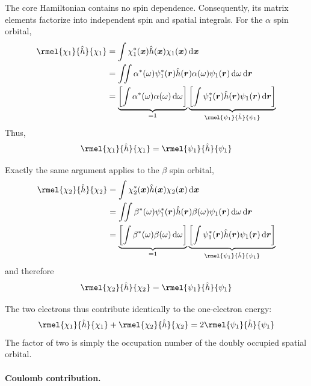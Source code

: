 \documentclass[11pt,a4paper,titlepage]{article}
\numberwithin{equation}{section}
\newcommand{\br}{\boldsymbol{r}}
\newcommand{\bx}{\boldsymbol{x}}
\newcommand{\hh}{\Hat{h}}
\begin{document}
The core Hamiltonian contains no spin dependence. Consequently, its matrix
elements factorize into independent spin and spatial integrals. For the
$\alpha$ spin orbital,
\begin{equation}
\begin{split}
  \rmel{\chi_1}{\hh}{\chi_1}
  &=
  \int
  \chi_1^*(\bx)
  \hh(\bx)
  \chi_1(\bx)
  \dd{\bx}
  \\
  &=
  \iint
  \alpha^*(\omega)
  \psi_1^*(\br)
  \hh(\br)
  \alpha(\omega)
  \psi_1(\br)
  \dd{\omega}\dd{\br}
  \\
  &=
  \underbrace{
  \qty[
    \int
    \alpha^*(\omega)\alpha(\omega)
    \dd{\omega}
  ]}_{=1}
  \underbrace{
  \qty[
    \int
    \psi_1^*(\br)
    \hh(\br)
    \psi_1(\br)
    \dd{\br}
  ]}_{\rmel{\psi_1}{\hh}{\psi_1}}
\end{split}
\end{equation}
Thus,
\begin{equation}
  \rmel{\chi_1}{\hh}{\chi_1}
  =
  \rmel{\psi_1}{\hh}{\psi_1}
\end{equation}

Exactly the same argument applies to the $\beta$ spin orbital,
\begin{equation}
\begin{split}
  \rmel{\chi_2}{\hh}{\chi_2}
  &=
  \int
  \chi_2^*(\bx)
  \hh(\bx)
  \chi_2(\bx)
  \dd{\bx}
  \\
  &=
  \iint
  \beta^*(\omega)
  \psi_1^*(\br)
  \hh(\br)
  \beta(\omega)
  \psi_1(\br)
  \dd{\omega}\dd{\br}
  \\
  &=
  \underbrace{
  \qty[
    \int
    \beta^*(\omega)\beta(\omega)
    \dd{\omega}
  ]}_{=1}
  \underbrace{
  \qty[
    \int
    \psi_1^*(\br)
    \hh(\br)
    \psi_1(\br)
    \dd{\br}
  ]}_{\rmel{\psi_1}{\hh}{\psi_1}}
\end{split}
\end{equation}
and therefore
\begin{equation}
  \rmel{\chi_2}{\hh}{\chi_2}
  =
  \rmel{\psi_1}{\hh}{\psi_1}
\end{equation}

The two electrons thus contribute identically to the one-electron energy:
\begin{equation}
  \rmel{\chi_1}{\hh}{\chi_1}
  +
  \rmel{\chi_2}{\hh}{\chi_2}
  =
  2\rmel{\psi_1}{\hh}{\psi_1}
\end{equation}
The factor of two is simply the occupation number of the doubly occupied
spatial orbital.

\paragraph{Coulomb contribution.}
\end{document}
